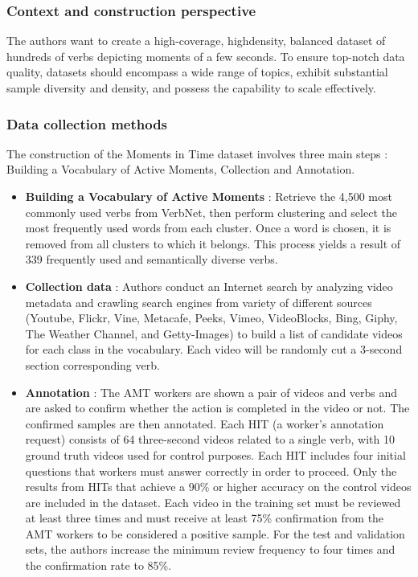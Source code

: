 \documentclass[10pt,onecolumn,letterpaper]{article}
\begin{document}
\subsubsection{Context and construction perspective} 
The authors want to create a high-coverage, highdensity, balanced dataset of hundreds of verbs depicting moments of a few seconds. To ensure top-notch data quality, datasets should encompass a wide range of topics, exhibit substantial sample diversity and density, and possess the capability to scale effectively.

\subsubsection{Data collection methods}

The construction of the Moments in Time dataset involves three main steps : Building a Vocabulary of Active Moments, Collection and Annotation.

\begin{itemize}
	\item \textbf{Building a Vocabulary of Active Moments} : Retrieve the 4,500 most commonly used verbs from VerbNet, then perform clustering and select the most frequently used words from each cluster. Once a word is chosen, it is removed from all clusters to which it belongs. This process yields a result of 339 frequently used and semantically diverse verbs.
	
	\item \textbf{Collection data} : Authors conduct an Internet search by analyzing video metadata and crawling search engines from variety of different sources (Youtube, Flickr, Vine, Metacafe, Peeks, Vimeo, VideoBlocks, Bing, Giphy, The Weather Channel, and Getty-Images) to build a list of candidate videos for each class in the vocabulary. Each video will be randomly cut a 3-second section corresponding verb. 
	
	\item \textbf{Annotation} : The AMT workers are shown a pair of videos and verbs and are asked to confirm whether the action is completed in the video or not. The confirmed samples are then annotated. Each HIT (a worker's annotation request) consists of 64 three-second videos related to a single verb, with 10 ground truth videos used for control purposes. Each HIT includes four initial questions that workers must answer correctly in order to proceed. Only the results from HITs that achieve a 90\% or higher accuracy on the control videos are included in the dataset. Each video in the training set must be reviewed at least three times and must receive at least 75\% confirmation from the AMT workers to be considered a positive sample. For the test and validation sets, the authors increase the minimum review frequency to four times and the confirmation rate to 85\%.
	
\end{itemize}
\end{document}
